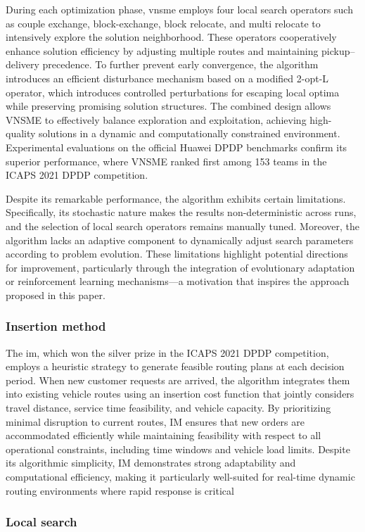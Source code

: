 \documentclass[preprint,12pt]{elsarticle}
\begin{document}
During each optimization phase, \gls{vnsme} employs four local search operators such as couple exchange, block-exchange, block relocate, and multi relocate to intensively explore the solution neighborhood. These operators cooperatively enhance solution efficiency by adjusting multiple routes and maintaining pickup–delivery precedence. To further prevent early convergence, the algorithm introduces an efficient disturbance mechanism based on a modified 2-opt-L operator, which introduces controlled perturbations for escaping local optima while preserving promising solution structures. The combined design allows VNSME to effectively balance exploration and exploitation, achieving high-quality solutions in a dynamic and computationally constrained environment. Experimental evaluations on the official Huawei DPDP benchmarks confirm its superior performance, where VNSME ranked first among 153 teams in the ICAPS 2021 DPDP competition.

Despite its remarkable performance, the algorithm exhibits certain limitations. Specifically, its stochastic nature makes the results non-deterministic across runs, and the selection of local search operators remains manually tuned. Moreover, the algorithm lacks an adaptive component to dynamically adjust search parameters according to problem evolution. These limitations highlight potential directions for improvement, particularly through the integration of evolutionary adaptation or reinforcement learning mechanisms—a motivation that inspires the approach proposed in this paper.
\subsubsection{Insertion method}
The \gls{im}, which won the silver prize in the ICAPS 2021 DPDP competition, employs a heuristic strategy to generate feasible routing plans at each decision period. When new customer requests are arrived, the algorithm integrates them into existing vehicle routes using an insertion cost function that jointly considers travel distance, service time feasibility, and vehicle capacity. By prioritizing minimal disruption to current routes, IM ensures that new orders are accommodated efficiently while maintaining feasibility with respect to all operational constraints, including time windows and vehicle load limits. Despite its algorithmic simplicity, IM demonstrates strong adaptability and computational efficiency, making it particularly well-suited for real-time dynamic routing environments where rapid response is critical
\subsubsection{Local search}
\end{document}
